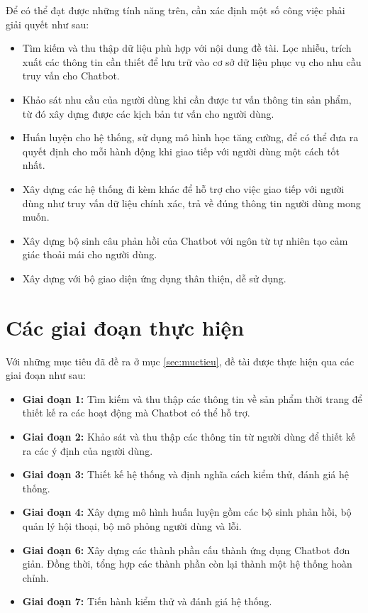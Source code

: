 Để có thể đạt được những tính năng trên, cần xác định một số công việc
phải giải quyết như sau:

\begin{itemize}
    \item Tìm kiếm và thu thập dữ liệu phù hợp với nội dung đề tài.
    Lọc nhiễu, trích xuất các thông tin cần thiết để lưu trữ vào
    cơ sở dữ liệu phục vụ cho nhu cầu truy vấn cho Chatbot.
    \item Khảo sát nhu cầu của người dùng khi cần được tư vấn
    thông tin sản phẩm, từ đó xây dựng được các kịch bản
    tư vấn cho người dùng.
    \item Huấn luyện cho hệ thống, sử dụng mô hình học tăng cường,
    để có thể đưa ra quyết định cho mỗi hành động khi giao tiếp
    với người dùng một cách tốt nhất.
    \item Xây dựng các hệ thống đi kèm khác để hỗ trợ cho việc
    giao tiếp với người dùng như truy vấn dữ liệu chính xác,
    trả về đúng thông tin người dùng mong muốn.
    \item Xây dựng bộ sinh câu phản hồi của Chatbot với ngôn từ
    tự nhiên tạo cảm giác thoải mái cho người dùng.
    \item Xây dựng với bộ giao diện ứng dụng thân thiện, dễ sử dụng.
\end{itemize}

\section{Các giai đoạn thực hiện}
Với những mục tiêu đã đề ra ở mục \ref{sec:muctieu}, đề tài được
thực hiện qua các giai đoạn như sau:

\begin{itemize}
    \item \textbf{Giai đoạn 1:} Tìm kiếm và thu thập các thông tin về
    sản phẩm thời trang để thiết kế ra các hoạt động mà Chatbot
    có thể hỗ trợ.
    \item \textbf{Giai đoạn 2:} Khảo sát và thu thập các thông tin từ
    người dùng để thiết kế ra các ý định của người dùng.
    \item \textbf{Giai đoạn 3:} Thiết kế hệ thống và định nghĩa cách
    kiểm thử, đánh giá hệ thống.
    \item \textbf{Giai đoạn 4:} Xây dựng mô hình huấn luyện gồm các
    bộ sinh phản hồi, bộ quản lý hội thoại, bộ mô phỏng người dùng và lỗi.
    \item \textbf{Giai đoạn 6:} Xây dựng các thành phần cấu thành
    ứng dụng Chatbot đơn giản. Đồng thời, tổng hợp các thành phần
    còn lại thành một hệ thống hoàn chỉnh.
    \item \textbf{Giai đoạn 7:} Tiến hành kiểm thử và đánh giá hệ thống.
\end{itemize}

